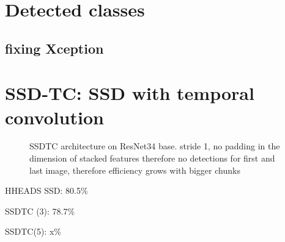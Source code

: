 \section{Detected classes}


\subsection{fixing Xception}
\label{sec:fixxception}


\section{SSD-TC: SSD with temporal convolution}
\begin{figure}
    \centering
    \ssdtc
    \caption[SSDTC architecture]{SSDTC architecture on ResNet34 base. stride 1, no padding in the dimension of stacked features therefore no detections for first and last image, therefore efficiency grows with bigger chunks}
    \label{fig:ssdtc}
\end{figure}


HHEADS SSD: 80.5\%

SSDTC (3): 78.7\%

SSDTC(5): x\%
